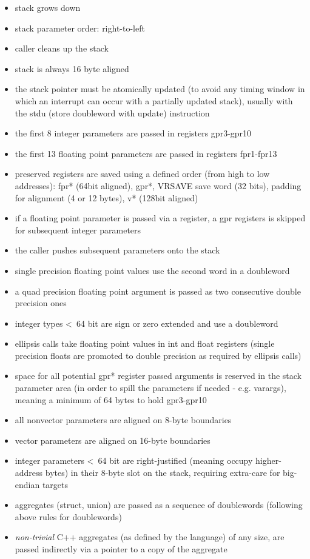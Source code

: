 \begin{itemize}
\item stack grows down
\item stack parameter order: right-to-left
\item caller cleans up the stack
\item stack is always 16 byte aligned
\item the stack pointer must be atomically updated (to avoid any timing window in which an interrupt can occur with a partially updated stack), usually with the stdu (store doubleword with update) instruction
\item the first 8 integer parameters are passed in registers gpr3-gpr10
\item the first 13 floating point parameters are passed in registers fpr1-fpr13
\item preserved registers are saved using a defined order (from high to low addresses):
 fpr* (64bit aligned),
 gpr*,
 VRSAVE save word (32 bits),
 padding for alignment (4 or 12 bytes),
 v* (128bit aligned)
\item if a floating point parameter is passed via a register, a gpr registers is skipped for subsequent integer parameters
\item the caller pushes subsequent parameters onto the stack
\item single precision floating point values use the second word in a doubleword 
\item a quad precision floating point argument is passed as two consecutive double precision ones
\item integer types \textless\ 64 bit are sign or zero extended and use a doubleword
\item ellipsis calls take floating point values in int and float registers (single precision floats are promoted to double precision as
required by ellipsis calls)
\item space for all potential gpr* register passed arguments is reserved in the stack parameter area (in order to spill the parameters if
needed - e.g. varargs), meaning a minimum of 64 bytes to hold gpr3-gpr10
\item all nonvector parameters are aligned on 8-byte boundaries
\item vector parameters are aligned on 16-byte boundaries
\item integer parameters \textless\ 64 bit are right-justified (meaning occupy higher-address bytes) in their 8-byte slot on the stack, requiring extra-care for big-endian targets
\item aggregates (struct, union) are passed as a sequence of doublewords (following above rules for doublewords)
\item {\it non-trivial} C++ aggregates (as defined by the language) of any size, are passed indirectly via a pointer to a copy of the aggregate
\end{itemize}


